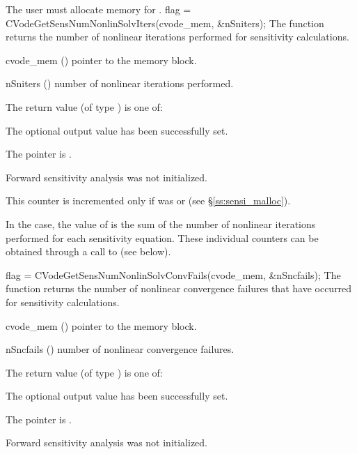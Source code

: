 {
  The user must allocate memory for .
}
{
  flag = CVodeGetSensNumNonlinSolvIters(cvode\_mem, \&nSniters);
}
{
  The function  returns the
  number of nonlinear iterations performed for 
  sensitivity calculations.
}
{
  \begin{args}
  \item[cvode\_mem] ()
    pointer to the {\cvodes} memory block.
  \item[nSniters] ()
    number of nonlinear iterations performed.
  \end{args}
}
{
  The return value  (of type ) is one of:
  \begin{args}
  \item[\Id{CV\_SUCCESS}] 
    The optional output value has been successfully set.
  \item[\Id{CV\_MEM\_NULL}]
    The  pointer is .
  \item[\Id{CV\_NO\_SENS}]
    Forward sensitivity analysis was not initialized.
  \end{args}
}
{
  This counter is incremented only if  was  or 
   (see \S\ref{ss:sensi_malloc}).
  
  In the  case, the value of  is the sum of 
  the number of nonlinear iterations performed for each sensitivity equation.
  These individual counters can be obtained through a call to
   (see below).
}
{
  flag = CVodeGetSensNumNonlinSolvConvFails(cvode\_mem, \&nSncfails);
}
{
  The function  returns the
  number of nonlinear convergence failures that have occurred for
  sensitivity calculations.
}
{
  \begin{args}
  \item[cvode\_mem] ()
    pointer to the {\cvodes} memory block.
  \item[nSncfails] ()
    number of nonlinear convergence failures.
  \end{args}
}
{
  The return value  (of type ) is one of:
  \begin{args}
  \item[\Id{CV\_SUCCESS}] 
    The optional output value has been successfully set.
  \item[\Id{CV\_MEM\_NULL}]
    The  pointer is .
  \item[\Id{CV\_NO\_SENS}]
    Forward sensitivity analysis was not initialized.
  \end{args}
}

